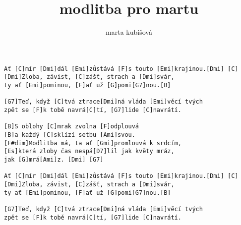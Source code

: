 \author{marta kubišová}
\title{modlitba pro martu}
\maketitle
\begin{verbatim}
Ať [C]mír [Dmi]dál [Emi]zůstává [F]s touto [Emi]krajinou.[Dmi] [C]
[Dmi]Zloba, závist, [C]zášť, strach a [Dmi]svár,
ty ať [Emi]pominou, [F]ať už [G]pomi[G7]nou.[B]

[G7]Teď, když [C]tvá ztrace[Dmi]ná vláda [Emi]věcí tvých
zpět se [F]k tobě navrá[C]tí, [G7]lide [C]navrátí.

[B]S oblohy [C]mrak zvolna [F]odplouvá
[B]a každý [C]sklízí setbu [Ami]svou.
[F#dim]Modlitba má, ta ať [Gmi]promlouvá k srdcím,
[Es]která zloby čas nespá[D7]lil jak květy mráz,
jak [G]mrá[Ami]z. [Dmi] [G7]

Ať [C]mír [Dmi]dál [Emi]zůstává [F]s touto [Emi]krajinou.[Dmi] [C]
[Dmi]Zloba, závist, [C]zášť, strach a [Dmi]svár,
ty ať [Emi]pominou, [F]ať už [G]pomi[G7]nou.[B]

[G7]Teď, když [C]tvá ztrace[Dmi]ná vláda [Emi]věcí tvých
zpět se [F]k tobě navrá[C]tí, [G7]lide [C]navrátí.
\end{verbatim}